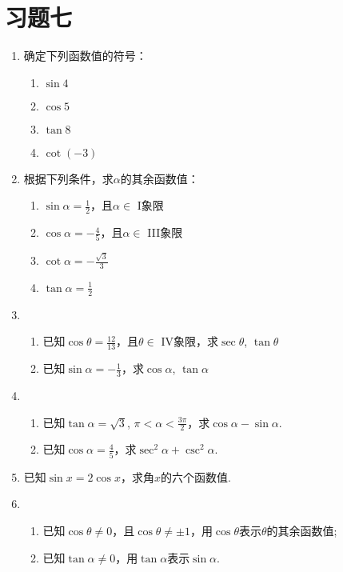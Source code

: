 \section*{习题七}
\begin{enumerate}
    \item 确定下列函数值的符号：
\begin{multicols}{4}
\begin{enumerate}[(1)]
    \item $\sin 4$
    \item $\cos 5$
    \item $\tan 8$
    \item $\cot(-3)$
\end{enumerate}
\end{multicols}

\item 根据下列条件，求$\alpha$的其余函数值：
\begin{multicols}{2}
\begin{enumerate}[(1)]
    \item $\sin\alpha=\frac{1}{2}$，且$\alpha\in $ I象限
    \item $\cos\alpha=-\frac{4}{5}$，且$\alpha\in $ III象限
    \item $\cot\alpha=-\frac{\sqrt{3}}{3}$
    \item $\tan\alpha=\frac{1}{2}$
\end{enumerate}
\end{multicols}

\item \begin{enumerate}[(1)]
    \item 已知$\cos\theta=\frac{12}{13}$，且$\theta\in $ IV象限，求$\sec\theta$, $\tan\theta$
    \item 已知$\sin\alpha=-\frac{1}{3}$，求$\cos\alpha$, $\tan\alpha$
\end{enumerate}

\item \begin{enumerate}[(1)]
    \item 已知$\tan\alpha=\sqrt{3}$, $\pi<\alpha<\frac{3\pi}{2}$，求$\cos\alpha-\sin\alpha$.
    \item 已知$\cos\alpha=\frac{4}{5}$，求$\sec^2\alpha+\csc^2\alpha$.
\end{enumerate}

\item 已知$\sin x=2\cos x$，求角$x$的六个函数值.
\item \begin{enumerate}[(1)]
    \item 已知$\cos\theta\ne 0$，且$\cos\theta\ne \pm 1$，用$\cos\theta$表示$\theta$的其余函数值;
    \item 已知$\tan\alpha\ne 0$，用$\tan\alpha$表示$\sin\alpha$.
\end{enumerate}
\end{enumerate}

